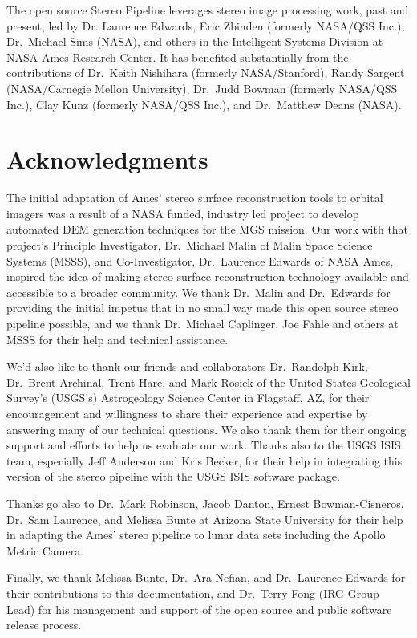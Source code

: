 The open source Stereo Pipeline leverages stereo image processing
work, past and present, led by Dr. Laurence Edwards, Eric Zbinden
(formerly NASA/QSS Inc.), Dr.~Michael Sims (NASA), and others in the
Intelligent Systems Division at NASA Ames Research Center. It has
benefited substantially from the contributions of Dr.~Keith Nishihara
(formerly NASA/Stanford), Randy Sargent (NASA/Carnegie Mellon
University), Dr.~Judd Bowman (formerly NASA/QSS Inc.), Clay Kunz
(formerly NASA/QSS Inc.), and Dr.~Matthew Deans (NASA).

\section*{Acknowledgments}

The initial adaptation of Ames' stereo surface reconstruction tools to
orbital imagers was a result of a NASA funded, industry led project to
develop automated \ac{DEM} generation techniques for
the \ac{MGS} mission. Our work with that project's
Principle Investigator, Dr.~Michael Malin of Malin Space Science
Systems (MSSS), and Co-Investigator, Dr.~Laurence Edwards of NASA
Ames, inspired the idea of making stereo surface reconstruction
technology available and accessible to a broader community.  We thank
Dr.~Malin and Dr.~Edwards for providing the initial impetus that in no
small way made this open source stereo pipeline possible, and we thank
Dr.~Michael Caplinger, Joe Fahle and others at MSSS for their help and
technical assistance.

We'd also like to thank our friends and collaborators Dr.~Randolph
Kirk, Dr.~Brent Archinal, Trent Hare, and Mark Rosiek of the United
States Geological Survey's (USGS's) Astrogeology Science Center in
Flagstaff, AZ, for their encouragement and willingness to share
their experience and expertise by answering many of our technical
questions.  We also thank them for their ongoing support and efforts
to help us evaluate our work.  Thanks also to the USGS \ac{ISIS} team,
especially Jeff Anderson and Kris Becker, for their help in integrating
this version of the stereo pipeline with the USGS \ac{ISIS} software
package.

Thanks go also to Dr.~Mark Robinson, Jacob Danton, Ernest
Bowman-Cisneros, Dr.~Sam Laurence, and Melissa Bunte at Arizona State
University for their help in adapting the Ames' stereo pipeline to
lunar data sets including the Apollo Metric Camera.

Finally, we thank Melissa Bunte, Dr.~Ara Nefian, and Dr.~Laurence
Edwards for their contributions to this documentation, and Dr.~Terry
Fong (IRG Group Lead) for his management and support of the open
source and public software release process.

